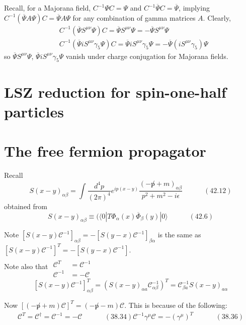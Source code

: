 \documentclass[twoside]{amsart}
\newcommand{\solutionhead}[1]
  {\smallskip
   \noindent{\large\bf Solution #1.}
   }
\begin{document}
Recall, for a Majorana field, $C^{-1} \Psi C = \Psi$ and $C^{-1} \overline{\Psi} C = \overline{\Psi}$, implying $C^{-1} (\overline{\Psi} A \Psi ) C = \overline{\Psi} A \Psi$ for any combination of gamma matrices $A$.  Clearly, 
\[
\begin{aligned}
  & C^{-1} ( \overline{\Psi} S^{\mu \nu} \Psi)C = \overline{\Psi} S^{ \mu \nu} \Psi = - \overline{\Psi} S^{\mu \nu } \Psi \\ 
  & C^{-1} ( \overline{\Psi} i S^{\mu \nu} \gamma_5 \Psi ) C = \overline{\Psi} i S^{\mu \nu} \gamma_5 \Psi = - \overline{\Psi} ( i S^{\mu \nu } \gamma_5 ) \Psi 
\end{aligned}
\]
so $\overline{\Psi} S^{\mu \nu} \Psi$, $\overline{\Psi} i S^{\mu \nu} \gamma_5 \Psi$ vanish under charge conjugation for Majorana fields.  

\section{LSZ reduction for spin-one-half particles}

\section{The free fermion propagator}

\solutionhead{42.1}

Recall 
\[
S(x-y)_{\alpha \beta} = \int \frac{d^4p }{ (2\pi)^4} e^{i p(x-y) } \frac{ (- \not p + m)_{\alpha \beta} }{ p^2 + m^2 - i \epsilon } \quad \quad \quad (42.12)
\]
obtained from 
\[
S(x-y)_{\alpha \beta} \equiv ( \langle 0 | T \Phi_{\alpha}(x) \overline{\Phi}_{\beta}(y) | 0 \rangle \quad \quad \quad (42.6) 
\]

Note $[ S(x-y) \mathcal{C}^{-1}]_{\alpha \beta} = - [ S(y-x) \mathcal{C}^{-1} ]_{\beta \alpha}$ is the same as \\
\phantom{Note } $[S(x-y) \mathcal{C}^{-1}]^T = - [ S(y-x) \mathcal{C}^{-1} ]$.  \\

Note also that $\begin{aligned} & \quad \\ 
  \mathcal{C}^T & = \mathcal{C}^{-1} \\ 
  \mathcal{C}^{-1} & =  - \mathcal{C} \end{aligned}$ 
\[
[ S(x-y) \mathcal{C}^{-1} ]^T_{\alpha \beta} = ( S(x-y)_{\alpha a} \mathcal{C}^{-1}_{\alpha \beta} )^T = \mathcal{C}^{-1}_{\beta a } S(x-y)_{a \alpha} 
\]

Now $[(-\not p +m)\mathcal{C}]^T = (-\not p - m ) \mathcal{C}$.  This is because of the following:
\[
\begin{gathered}
  \mathcal{C}^T = \mathcal{C}^{\dag} = \mathcal{C}^{-1} = - \mathcal{C}  \quad \quad \quad \, (38.34)
  \mathcal{C}^{-1} \gamma^{\mu} \mathcal{C} = - (\gamma^{\mu})^T \quad \quad \quad \, (38.36)
\end{gathered}
\]  
\end{document}
